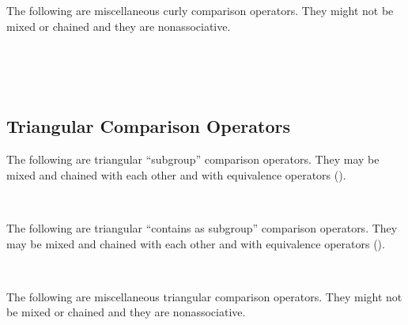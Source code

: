 The following are miscellaneous curly comparison operators.
They might not be mixed or chained and they are nonassociative.
\begin{tabbing}
\UnicodeKillLine
{} \\
 \\
 \\
\end{tabbing}

\subsection{Triangular Comparison Operators}

The following are triangular ``subgroup'' comparison operators.  They may be mixed and chained
with each other and with equivalence operators
().
\begin{tabbing}
\UnicodeKillLine
{} \\
\end{tabbing}

The following are triangular ``contains as subgroup'' comparison operators.  They may be mixed and chained
with each other and with equivalence operators
().
\begin{tabbing}
\UnicodeKillLine
{} \\
\end{tabbing}

The following are miscellaneous triangular comparison operators.
They might not be mixed or chained and they are nonassociative.
\begin{tabbing}
\UnicodeKillLine
{} \\
 \\
 \\
\end{tabbing}

